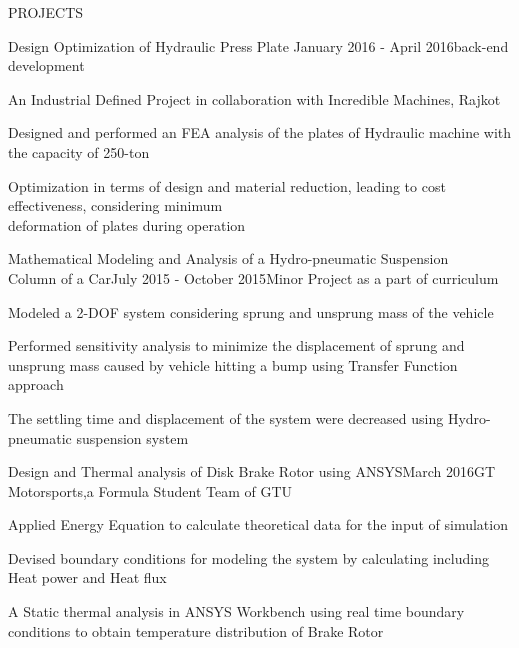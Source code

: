 \documentclass{resume} %
\begin{document}

\begin{rSection}{PROJECTS}

\begin{rSubsection}{Design Optimization of Hydraulic Press Plate} {January 2016 - April 2016}{back-end development}{}

\item An Industrial Defined Project in collaboration with Incredible Machines, Rajkot
\item Designed and performed an FEA analysis of the plates of Hydraulic machine with the capacity of 250-ton    
\item Optimization in terms of design and material reduction, leading to cost effectiveness, considering minimum \\deformation of plates during operation 
 
\end{rSubsection}  


\begin{rSubsection}{Mathematical Modeling and Analysis of a Hydro-pneumatic Suspension
\\Column of a Car}{July 2015 - October 2015}{Minor Project as a part of curriculum}{} 
\item Modeled a 2-DOF system considering sprung and unsprung mass of the vehicle
\item Performed sensitivity analysis to minimize the displacement of sprung and unsprung mass caused by vehicle hitting a bump using Transfer Function approach  
\item The settling time and displacement of the system were decreased using Hydro-pneumatic suspension system   

\end{rSubsection}



\begin{rSubsection}{Design and Thermal analysis of Disk Brake Rotor using ANSYS}{March 2016}{GT Motorsports,a Formula Student Team of GTU}{}

\item Applied Energy Equation to calculate theoretical data for the input of simulation
\item Devised boundary conditions for modeling the system by calculating including Heat power and Heat flux    
\item A Static thermal analysis in ANSYS Workbench using real time boundary conditions to obtain temperature distribution of Brake Rotor  


\end{rSubsection}
\end{rSection}
\end{document}
